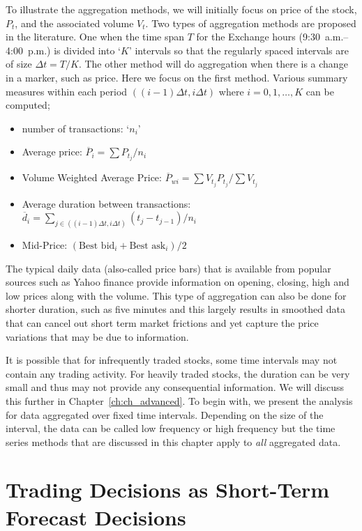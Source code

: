 To illustrate the aggregation methods, we will initially focus on price of the stock, $P_t$, and the associated volume $V_{t}$. Two types of aggregation methods are proposed in the literature. One when the time span $T$ for the Exchange hours (9:30~a.m.--4:00~p.m.) is divided into `$K$' intervals so that the regularly spaced intervals are of size $\Delta t = T/K$. The other method will do aggregation when there is a change in a marker, such as price. Here we focus on the first method. Various summary measures within each period $((i - 1)\Delta t, i\Delta t)$ where $i = 0,1,\ldots,K$ can be computed;
        \begin{itemize}
        \item number of transactions: `$n_i$'
        \item Average price: $\overline{P}_i = \sum P_{t_j}/n_i$
        \item Volume Weighted Average Price: $\overline{P}_{wi} = \sum V_{t_j} P_{t_j}/ \sum V_{t_j}$
        \item Average duration between transactions: $\overline{d}_i = \sum_{j\in ((i-1)\Delta t,i\Delta t) }(t_j - t_{j-1})/n_i$
        \item Mid-Price: $(\text{Best bid}_i+\text{Best ask}_i)/ 2$
        \end{itemize}


The typical daily data (also-called price bars) that is available from popular sources such as Yahoo finance provide information on opening, closing, high and low prices along with the volume. This type of aggregation can also be done for shorter duration, such as five minutes and this largely results in smoothed data that can cancel out short term market frictions and yet capture the price variations that may be due to information. 


It is possible that for infrequently traded stocks, some time intervals may not contain any trading activity. For heavily traded stocks, the duration can be very small and thus may not provide any consequential information. We will discuss this further in Chapter~\ref{ch:ch_advanced}. To begin with, we present the analysis for data aggregated over fixed time intervals. Depending on the size of the interval, the data can be called low frequency or high frequency but the time series methods that are discussed in this chapter apply to \emph{all} aggregated data.



\section{Trading Decisions as Short-Term Forecast Decisions \label{sec:trad_dec_stfd}} 


